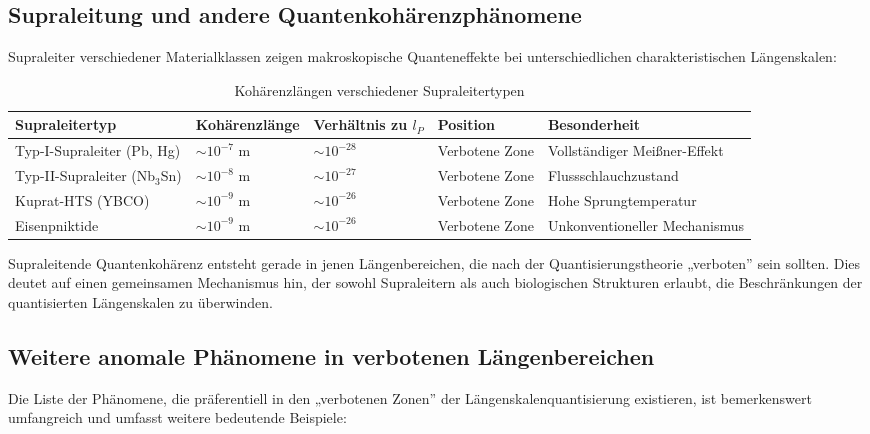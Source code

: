\documentclass[12pt,a4paper]{article}
\begin{document}
	\subsection{Supraleitung und andere Quantenkohärenzphänomene}
	
	Supraleiter verschiedener Materialklassen zeigen makroskopische Quanteneffekte bei unterschiedlichen charakteristischen Längenskalen:
	
	\begin{table}[h]
		\centering
		\begin{adjustbox}{scale=0.75}
			\begin{tabular}{lllll}
				\hline
				\textbf{Supraleitertyp} & \textbf{Kohärenzlänge} & \textbf{Verhältnis zu $l_P$} & \textbf{Position} & \textbf{Besonderheit} \\
				\hline
				Typ-I-Supraleiter (Pb, Hg) & $\sim 10^{-7}$ m & $\sim 10^{-28}$ & Verbotene Zone & Vollständiger Meißner-Effekt \\
				Typ-II-Supraleiter (Nb$_3$Sn) & $\sim 10^{-8}$ m & $\sim 10^{-27}$ & Verbotene Zone & Flussschlauchzustand \\
				Kuprat-HTS (YBCO) & $\sim 10^{-9}$ m & $\sim 10^{-26}$ & Verbotene Zone & Hohe Sprungtemperatur \\
				Eisenpniktide & $\sim 10^{-9}$ m & $\sim 10^{-26}$ & Verbotene Zone & Unkonventioneller Mechanismus \\
				\hline
			\end{tabular}
		\end{adjustbox}
		\caption{Kohärenzlängen verschiedener Supraleitertypen}
		\label{tab:supercond}
	\end{table}
	
	Supraleitende Quantenkohärenz entsteht gerade in jenen Längenbereichen, die nach der Quantisierungstheorie „verboten'' sein sollten. Dies deutet auf einen gemeinsamen Mechanismus hin, der sowohl Supraleitern als auch biologischen Strukturen erlaubt, die Beschränkungen der quantisierten Längenskalen zu überwinden.
	
	\subsection{Weitere anomale Phänomene in verbotenen Längenbereichen}
	
	Die Liste der Phänomene, die präferentiell in den „verbotenen Zonen'' der Längenskalenquantisierung existieren, ist bemerkenswert umfangreich und umfasst weitere bedeutende Beispiele:
	
\end{document}
